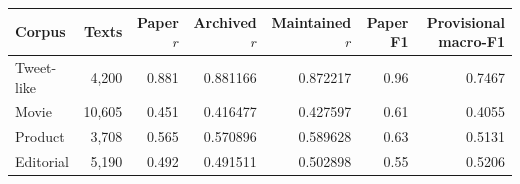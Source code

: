 \begin{tabular}{lrrrrrr}
\toprule
Corpus & Texts & Paper $r$ & Archived $r$ & Maintained $r$ & Paper F1 & Provisional macro-F1\\
\midrule
Tweet-like & 4,200 & 0.881 & 0.881166 & 0.872217 & 0.96 & 0.7467 \\
Movie & 10,605 & 0.451 & 0.416477 & 0.427597 & 0.61 & 0.4055 \\
Product & 3,708 & 0.565 & 0.570896 & 0.589628 & 0.63 & 0.5131 \\
Editorial & 5,190 & 0.492 & 0.491511 & 0.502898 & 0.55 & 0.5206 \\
\bottomrule
\end{tabular}
